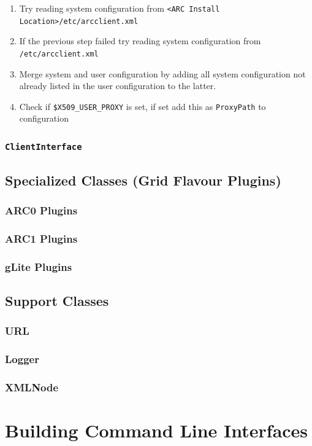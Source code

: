 \documentclass{book}
\newcommand{\ClientInterface}{\texttt{ClientInterface}}
\begin{document}
\begin{enumerate}
\item{Try reading system configuration from \texttt{<ARC Install Location>/etc/arcclient.xml}}
\item{If the previous step failed try reading system configuration from \texttt{/etc/arcclient.xml}}
\item{Merge system and user configuration by adding all system configuration not already listed 
in the user configuration to the latter.}
\item{Check if \texttt{\$X509\_USER\_PROXY} is set, if set add this as \texttt{ProxyPath} to configuration}
\end{enumerate}  

\subsection{{\ClientInterface}}

\section{Specialized Classes (Grid Flavour Plugins)}
\label{sec:plugins}
\subsection{ARC0 Plugins}
\subsection{ARC1 Plugins}
\subsection{gLite Plugins}

\section{Support Classes}
\subsection{URL}
\subsection{Logger}
\subsection{XMLNode}

\chapter{Building Command Line Interfaces}
\label{sec:cli}


\end{document}
